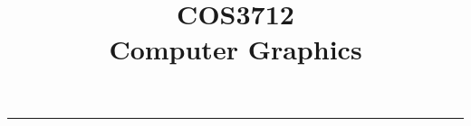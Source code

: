 \documentclass[11pt, a4paper]{book}
\title{COS3712\\Computer Graphics}
\author{ }
\begin{document}
	\begin{titlepage}
		\maketitle
	\end{titlepage}
	\clearpage\begingroup\pagestyle{empty}\cleardoublepage\endgroup
	\tableofcontents
	\noindent\rule{\textwidth}{0.4pt}
\end{document}
